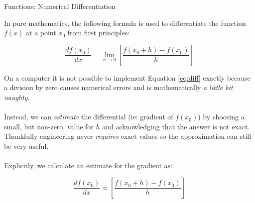 \documentclass{lab}
\begin{document}
\pagebreak
\begin{task}{Functions: Numerical Differentiation}{}

In pure mathematics, the following formula is used to differentiate the function $f(x)$ at a point $x_0$ from first principles:

\begin{equation}\label{eq:diff}
\frac{df(x_0)}{dx} = \lim_{h\to 0} \left[ \frac{f(x_0 + h) - f(x_0)}{h}\right]
\end{equation}

On a computer it is not possible to implement Equation \eqref{eq:diff} exactly because a division by zero causes numerical errors and is mathematically \textit{a little bit naughty}.
\\~\\
Instead, we can \textit{estimate} the differential (ie: gradient of $f(x_0)$) by choosing a small, but non-zero, value for $h$ and acknowledging that the answer is not exact. Thankfully engineering never \textit{requires} exact values so the approximation can still be very useful.
\\~\\
Explicitly, we calculate an estimate for the gradient as:

\begin{equation}\label{eq:diffest}
\frac{df(x_0)}{dx} \approx \left[ \frac{f(x_0 + h) - f(x_0)}{h}\right]
\end{equation}


\end{task}
\end{document}
